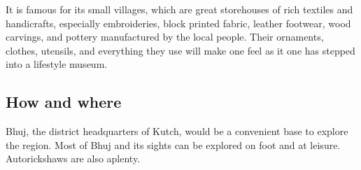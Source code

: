 It is famous for its small villages, which are great storehouses of rich textiles and handicrafts, especially embroideries, block printed fabric, leather footwear, wood carvings, and pottery manufactured by the local people. Their ornaments, clothes, utensils, and everything they use will make one feel as it one has stepped into a lifestyle museum.


\subsection{How and where} %
\label{sub:haw}

Bhuj, the district headquarters of Kutch, would be a convenient base to explore the region. Most of Bhuj and its sights can be explored on foot and at leisure. Autorickshaws are also aplenty.




